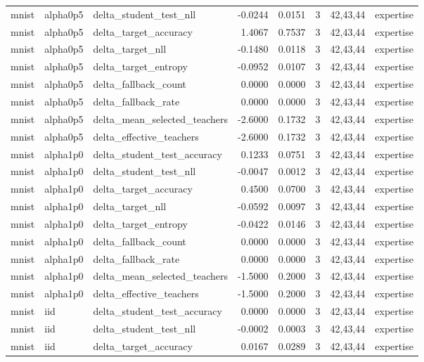 \begin{tabular}{lllrrrll}
mnist & alpha0p5 & delta\_student\_test\_nll & -0.0244 & 0.0151 & 3 & 42,43,44 & expertise \\
mnist & alpha0p5 & delta\_target\_accuracy & 1.4067 & 0.7537 & 3 & 42,43,44 & expertise \\
mnist & alpha0p5 & delta\_target\_nll & -0.1480 & 0.0118 & 3 & 42,43,44 & expertise \\
mnist & alpha0p5 & delta\_target\_entropy & -0.0952 & 0.0107 & 3 & 42,43,44 & expertise \\
mnist & alpha0p5 & delta\_fallback\_count & 0.0000 & 0.0000 & 3 & 42,43,44 & expertise \\
mnist & alpha0p5 & delta\_fallback\_rate & 0.0000 & 0.0000 & 3 & 42,43,44 & expertise \\
mnist & alpha0p5 & delta\_mean\_selected\_teachers & -2.6000 & 0.1732 & 3 & 42,43,44 & expertise \\
mnist & alpha0p5 & delta\_effective\_teachers & -2.6000 & 0.1732 & 3 & 42,43,44 & expertise \\
mnist & alpha1p0 & delta\_student\_test\_accuracy & 0.1233 & 0.0751 & 3 & 42,43,44 & expertise \\
mnist & alpha1p0 & delta\_student\_test\_nll & -0.0047 & 0.0012 & 3 & 42,43,44 & expertise \\
mnist & alpha1p0 & delta\_target\_accuracy & 0.4500 & 0.0700 & 3 & 42,43,44 & expertise \\
mnist & alpha1p0 & delta\_target\_nll & -0.0592 & 0.0097 & 3 & 42,43,44 & expertise \\
mnist & alpha1p0 & delta\_target\_entropy & -0.0422 & 0.0146 & 3 & 42,43,44 & expertise \\
mnist & alpha1p0 & delta\_fallback\_count & 0.0000 & 0.0000 & 3 & 42,43,44 & expertise \\
mnist & alpha1p0 & delta\_fallback\_rate & 0.0000 & 0.0000 & 3 & 42,43,44 & expertise \\
mnist & alpha1p0 & delta\_mean\_selected\_teachers & -1.5000 & 0.2000 & 3 & 42,43,44 & expertise \\
mnist & alpha1p0 & delta\_effective\_teachers & -1.5000 & 0.2000 & 3 & 42,43,44 & expertise \\
mnist & iid & delta\_student\_test\_accuracy & 0.0000 & 0.0000 & 3 & 42,43,44 & expertise \\
mnist & iid & delta\_student\_test\_nll & -0.0002 & 0.0003 & 3 & 42,43,44 & expertise \\
mnist & iid & delta\_target\_accuracy & 0.0167 & 0.0289 & 3 & 42,43,44 & expertise \\

\end{tabular}
